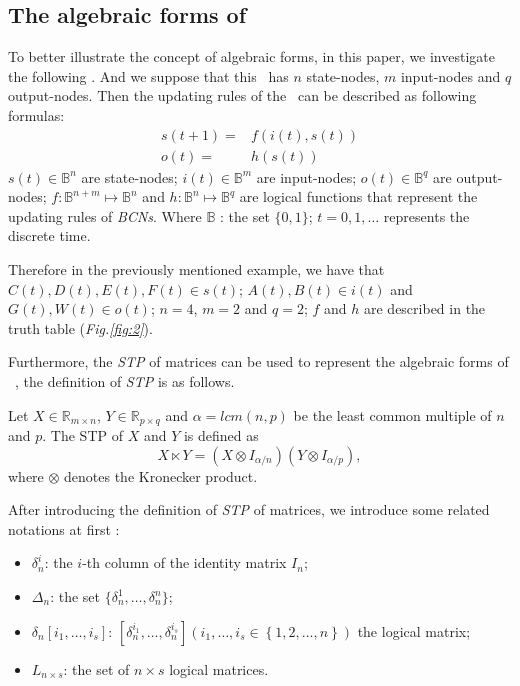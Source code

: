\subsection{The algebraic forms of \BCNs}
To better illustrate the concept of algebraic forms, in this paper, we investigate the following \BCN. And we suppose that this \BCN\ has $n$ state-nodes, $m$ input-nodes and $q$ output-nodes. Then the updating rules of the \BCN\ can be described as following formulas:
\begin{equation}
\begin{split}
s(t+1)=&f(i(t),s(t))\\
o(t)=&h(s(t))
\end{split}
\label{equ:1}
\end{equation}
$s(t)\in \mathbb{B}^n$ are state-nodes; $i(t)\in \mathbb{B}^m$ are input-nodes; $o(t)\in \mathbb{B}^q$ are output-nodes; $f:\mathbb{B}^{n+m}\mapsto \mathbb{B}^n$ and $h:\mathbb{B}^n\mapsto \mathbb{B}^q$ are logical functions that represent the updating rules of {\em BCNs}. Where $\mathbb{B}$ : the set $\{0,1\}$; $t=0,1,\ldots$ represents the discrete time. 

Therefore in the previously mentioned example, we have that $C(t), D(t), E(t), F(t)\in s(t)$; $A(t), B(t)\in i(t)$ and $G(t), W(t)\in o(t)$; $n=4$, $m=2$ and $q=2$; $f$ and $h$ are described in the truth table ({\em Fig.\ref{fig:2}}). 

Furthermore, the {\em STP} of matrices can be used to represent the algebraic forms of \BCNs\ \cite{cheng2009controllability}, the definition of {\em STP} is as follows.

\begin{definition}[STP] 
	\cite{Cheng2011Analysis} Let $X\in\mathbb{R}_{m\times n}$, $Y\in\mathbb{R}_{p\times q}$ and $\alpha=lcm(n,p)$ be the least common multiple of $n$ and $p$. The STP of $X$ and $Y$ is defined as \[X\ltimes Y=(X\otimes I_{\alpha/n})(Y\otimes I_{\alpha/p}),\] where $\otimes$ denotes the Kronecker product. 
\end{definition}

After introducing the definition of {\em STP} of matrices,  we introduce some related notations at first \cite{Zhang2016Observability}:
\begin{itemize}
  \item $\delta^i_n$: the $i$-th column of the identity matrix $I_n$;
  \item $\Delta_n$: the set $\{\delta^1_n,\ldots,\delta^n_n \}$; 
  \item $\delta_n \left[i_1,\ldots,i_s\right]$: $\left[\delta^{i_1}_n,\ldots,\delta^{i_s}_n\right]\left(i_1,\ldots,i_s\in\left\{1,2,\ldots,n\right\}\right)$ the logical matrix;
  \item  $L_{n\times s}$: the set of $n\times s$ logical matrices.
\end{itemize}


